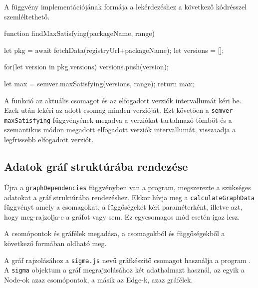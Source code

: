 A függvény implementációjának formája a lekérdezéshez a következő kódrésszel szemléltethető.

\pagebreak

\begin{js}
function findMaxSatisfying(packageName, range){
  let pkg = await fetchData(registryUrl+packageName);
  let versions = [];

  for(let version in pkg.versions){
    versions.push(version);
  }

  let max = semver.maxSatisfying(versions, range);
  return max;
}
\end{js}

A funkció az aktuális csomagot és az elfogadott verziók intervallumát kéri be. Ezek után lekéri az adott csomag minden verzióját. Ezt követően a \texttt{semver} \texttt{maxSatisfying} függvényének megadva a verziókat tartalmazó tömböt és a szemantikus módon megadott elfogadott verziók intervallumát, visszaadja a legfrissebb elfogadott verziót.

\subsection{Adatok gráf struktúrába rendezése}

Újra a \texttt{graphDependencies} függvényben van a program, megszerezte a szükséges adatokat a gráf struktúrába rendezéshez. Ekkor hívja meg a \texttt{calculateGraphData} függvényt amely a csomagokat, a függőségeket kéri paraméterként, illetve azt, hogy meg-rajzolja-e a gráfot vagy sem. Ez egycsomagos mód esetén igaz lesz.

A csomópontok és gráfélek megadása, a csomagokból és függőségekből a következő formában oldható meg.


A gráf rajzolásához a \texttt{sigma.js} nevű gráfkészítő csomagot használja a program \cite{sigma}. A \texttt{sigma} objektum a gráf megrajzolásához két adathalmazt használ, az egyik a Node-ok azaz csomópontok, a másik az Edge-k, azaz gráfélek.\\

